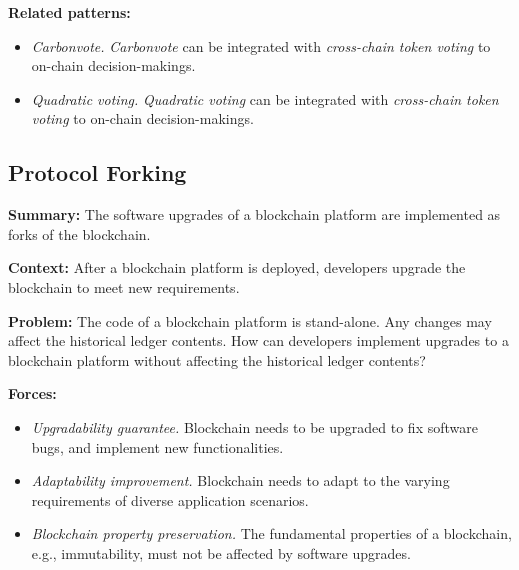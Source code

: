 \documentclass{article}
\begin{document}
\vspace{0.5em}\noindent \textbf{Related patterns:} 

\begin{itemize}

    \item \textit{Carbonvote.} \textit{Carbonvote} can be integrated with \textit{cross-chain token voting} to on-chain decision-makings.
    
    \item \textit{Quadratic voting.} \textit{Quadratic voting} can be integrated with \textit{cross-chain token voting} to on-chain decision-makings.

\end{itemize}



\subsection{Protocol Forking}

\vspace{0.5em}\noindent \textbf{Summary:} The software upgrades of a blockchain platform are implemented as forks of the blockchain.

\vspace{0.5em}\noindent \textbf{Context:} After a blockchain platform is deployed, developers upgrade the blockchain to meet new requirements.

\vspace{0.5em}\noindent \textbf{Problem:} The code of a blockchain platform is stand-alone. Any changes may affect the historical ledger contents. How can developers implement upgrades to a blockchain platform without affecting the historical ledger contents?

\vspace{0.5em}\noindent \textbf{Forces:} 

\begin{itemize}
  \item \textit{Upgradability guarantee.} Blockchain needs to be upgraded to fix software bugs, and implement new functionalities.

  \item \textit{Adaptability improvement.} Blockchain needs to adapt to the varying requirements of diverse application scenarios.
  
  \item \textit{Blockchain property preservation.} The fundamental properties of a blockchain, e.g., immutability, must not be affected by software upgrades.
\end{itemize}
\end{document}
